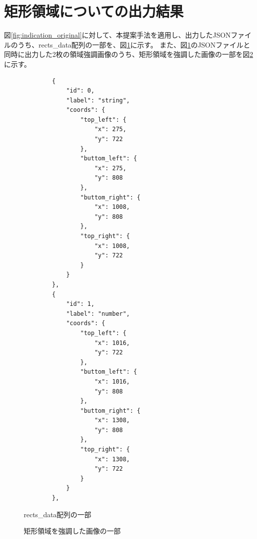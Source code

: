 \section{矩形領域についての出力結果}\label{sec:result_rect}
図\ref{fig:indication_original}に対して、本提案手法を適用し、出力したJSONファイルのうち、rects\_data配列の一部を、図\ref{fig:rects_data_json}に示す。
また、図\ref{fig:rects_data_json}のJSONファイルと同時に出力した2枚の領域強調画像のうち、矩形領域を強調した画像の一部を図\ref{fig:highlighted_rects_part}に示す。

\lstset{language=}
\begin{figure}[t]
    \begin{lstlisting}
        {
            "id": 0,
            "label": "string",
            "coords": {
                "top_left": {
                    "x": 275,
                    "y": 722
                },
                "buttom_left": {
                    "x": 275,
                    "y": 808
                },
                "buttom_right": {
                    "x": 1008,
                    "y": 808
                },
                "top_right": {
                    "x": 1008,
                    "y": 722
                }
            }
        },
        {
            "id": 1,
            "label": "number",
            "coords": {
                "top_left": {
                    "x": 1016,
                    "y": 722
                },
                "buttom_left": {
                    "x": 1016,
                    "y": 808
                },
                "buttom_right": {
                    "x": 1308,
                    "y": 808
                },
                "top_right": {
                    "x": 1308,
                    "y": 722
                }
            }
        },
    \end{lstlisting}
    \caption{rects\_data配列の一部}\label{fig:rects_data_json}
\end{figure}

\begin{figure}[t]
    \begin{center}
        \caption{矩形領域を強調した画像の一部}
        \label{fig:highlighted_rects_part}
    \end{center}
\end{figure}

